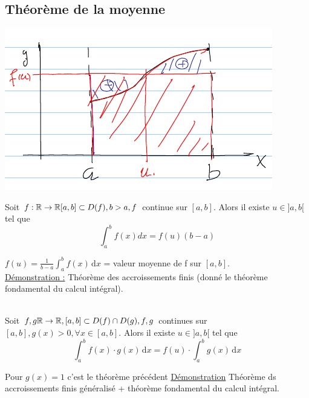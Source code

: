 \documentclass[12pt,a4paper]{article}
\begin{document}
{\subsection{Théorème de la moyenne}
\includegraphics[scale=0.5]{illustrations_analyse/theo_moyenne}\\
\begin{boite}
\Theoreme Soit $f: \mathbb{R} \to \mathbb{R} [a,b] \subset D(f), b>a, f$ continue sur $[a,b]$. Alors il existe $u \in ]a,b[$ tel que 
\begin{equation}
\int_a^b f(x) dx = f(u)(b-a)
\end{equation}
\end{boite}
 $f(u) = \frac{1}{b-a}\int_a^bf(x) \, \mathrm dx$ = valeur moyenne de f sur $[a,b]$.\\
\underline{Démonstration :} Théorème des accroissements finis (donné le théorème fondamental du calcul intégral).\\
\begin{boite}
	\\
	Soit $f,g \mathbb{R} \to \mathbb{R}, [a,b] \subset D(f) \cap D(g), f,g$ continues sur $[a,b], g(x) > 0, \forall x \in [a,b]$. Alors il existe $u \in]a,b[$ tel que
	\begin{equation}
		\int_a^b f(x) \cdot g(x) \, \mathrm{d}x = f(u) \cdot \int_a^bg(x) \, \mathrm dx
	\end{equation}	 
\end{boite}
Pour $g(x) = 1$ c'est le théorème précédent
\underline{Démonstration} Théorème ds accroissements finis généralisé  + théorème fondamental du calcul intégral.
}
\end{document}
